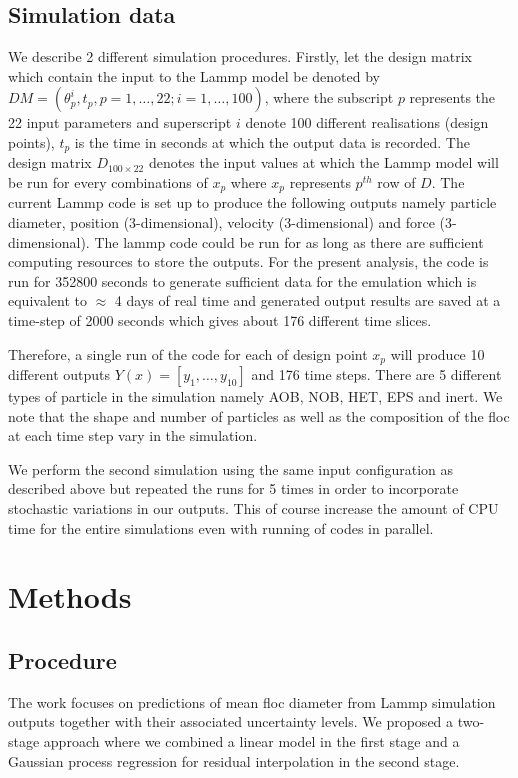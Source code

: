 \documentclass[12pt,titlepage]{report}
\theoremstyle{definition}
\theoremstyle{remark}
\begin{document}
\subsection*{Simulation data}
We describe 2 different simulation procedures. Firstly, let the design matrix which contain the input to the Lammp model be denoted by $DM=(\theta^i_p, t_p, p=1,\ldots,22; i=1,\ldots,100)$, where the subscript $p$ represents the 22 input parameters and superscript $i$ denote 100 different realisations (design points), $t_p$ is the time in seconds at which the output data is recorded. The design matrix $D_{100 \times 22}$ denotes the input values at which the Lammp model will be run for every combinations of $x_p$ where $x_p$ represents $p^{th}$ row of $D$. The current Lammp code is set up to produce the following outputs namely particle diameter, position (3-dimensional), velocity (3-dimensional) and force (3-dimensional). The lammp code could be run for as long as there are sufficient computing resources to store the outputs. For the present analysis, the code is run for 352800 seconds to generate sufficient data for the emulation which is equivalent to $\approx$ 4 days of real time and generated output results are saved at a time-step of 2000 seconds which gives about 176 different time slices. 

Therefore, a single run of the code for each of design point $x_p$ will produce 10 different outputs $Y(x)= [y_1,\ldots,y_{10}]$ and 176 time steps. There are 5 different types of particle in the simulation namely AOB, NOB, HET, EPS and inert. We note that the shape and number of particles as well as the composition of the floc at each time step vary in the simulation. 

We perform the second simulation using the same input configuration as described above but repeated the runs for 5 times in order to incorporate stochastic variations in our outputs. This of course increase the amount of CPU time for the entire simulations even with running of codes in parallel.%


\section*{Methods}
\subsection{Procedure}
The work focuses on predictions of mean floc diameter from Lammp simulation outputs together with their associated uncertainty levels. We proposed a two-stage approach where we combined a linear model in the first stage and a Gaussian process regression for residual interpolation in the second stage.
\end{document}
